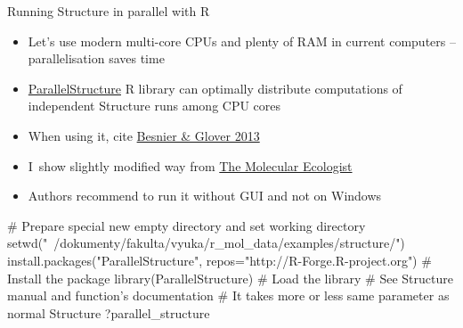 \documentclass[compress, ucs, xelatex, 11pt, xcolor=svgnames,
  hyperref={
    bookmarks=true,
    unicode=true,
    colorlinks=true,
    pdftitle={Molecular data in R},
    plainpages=false,
    pdfauthor={Vojtech Zeisek},
    pdfsubject={Course about phylogeny and evolution in R},
    pdfcreator={XeLaTeX},
    pdfkeywords={R, evolution, phylogeny, molecular data},
    linkcolor=Tomato,
    anchorcolor=SaddleBrown,
    citecolor=Goldenrod,
    filecolor=DarkMagenta,
    menucolor=Sienna,
    urlcolor=DarkTurquoise,
    pdftex},
  url={hyphens, lowtilde} %
  ]{beamer}
\begin{document}
\begin{frame}[fragile]{Running Structure in parallel with R}
\begin{itemize}
 \item Let's use modern multi-core CPUs and plenty of RAM in current computers -- parallelisation saves time
 \item \href{https://r-forge.r-project.org/R/?group_id=1636}{ParallelStructure} R library can optimally distribute computations of independent Structure runs among CPU cores
 \item When using it, cite \href{http://www.plosone.org/article/info\%3Adoi\%2F10.1371\%2Fjournal.pone.0070651}{Besnier \& Glover 2013}
 \item I~show slightly modified way from \href{http://www.molecularecologist.com/2013/09/using-r-to-run-parallel-analysis-of-population-genetic-data-in-structure-parallelstructure/}{The Molecular Ecologist}
 \item Authors recommend to run it without GUI and not on Windows
\end{itemize}
  \begin{spluscode}
    # Prepare special new empty directory and set working directory
    setwd("~/dokumenty/fakulta/vyuka/r_mol_data/examples/structure/")
    install.packages("ParallelStructure",
      repos="http://R-Forge.R-project.org") # Install the package
    library(ParallelStructure) # Load the library
    # See Structure manual and function's documentation
    # It takes more or less same parameter as normal Structure
    ?parallel_structure
  \end{spluscode}
\end{frame}
\end{document}
